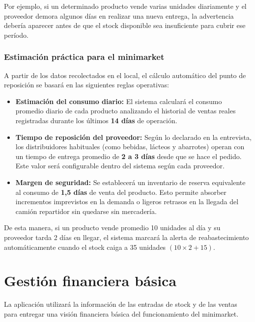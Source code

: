 \documentclass[10pt,a4paper]{article}
\begin{document}
Por ejemplo, si un determinado producto vende varias unidades diariamente y el proveedor demora algunos días en realizar una nueva entrega, la advertencia debería aparecer antes de que el stock disponible sea insuficiente para cubrir ese período.

\subsubsection{Estimación práctica para el minimarket}

A partir de los datos recolectados en el local, el cálculo automático del punto de reposición se basará en las siguientes reglas operativas:

\begin{itemize}
    \item \textbf{Estimación del consumo diario:} El sistema calculará el consumo promedio diario de cada producto analizando el historial de ventas reales registradas durante los últimos \textbf{14 días} de operación.
    \item \textbf{Tiempo de reposición del proveedor:} Según lo declarado en la entrevista, los distribuidores habituales (como bebidas, lácteos y abarrotes) operan con un tiempo de entrega promedio de \textbf{2 a 3 días} desde que se hace el pedido. Este valor será configurable dentro del sistema según cada proveedor.
    \item \textbf{Margen de seguridad:} Se establecerá un inventario de reserva equivalente al consumo de \textbf{1,5 días} de venta del producto. Esto permite absorber incrementos imprevistos en la demanda o ligeros retrasos en la llegada del camión repartidor sin quedarse sin mercadería.
\end{itemize}

De esta manera, si un producto vende promedio 10 unidades al día y su proveedor tarda 2 días en llegar, el sistema marcará la alerta de reabastecimiento automáticamente cuando el stock caiga a 35 unidades $(10 \times 2 + 15)$.



\section{Gestión financiera básica}

La aplicación utilizará la información de las entradas de stock y de las ventas para entregar una visión financiera básica del funcionamiento del minimarket.
\end{document}
